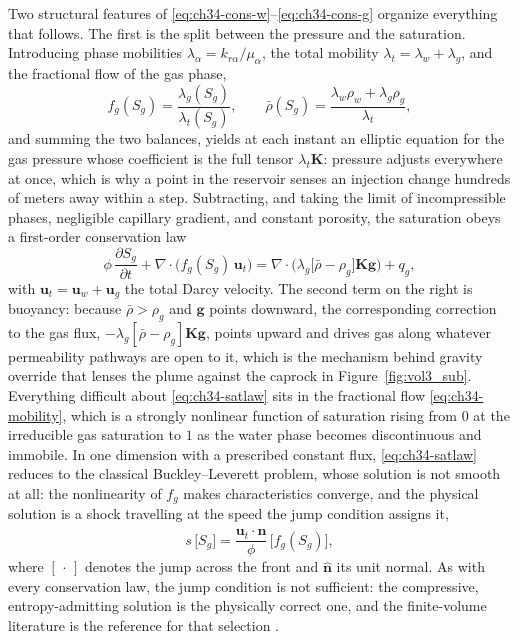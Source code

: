 Two structural features of \eqref{eq:ch34-cons-w}--\eqref{eq:ch34-cons-g} organize
everything that follows. The first is the split between the pressure and the
saturation. Introducing phase mobilities $\lambda_\alpha = k_{r\alpha}/\mu_\alpha$,
the total mobility $\lambda_t = \lambda_w + \lambda_g$, and the fractional flow of
the gas phase,
\begin{equation}
  f_g(S_g) = \frac{\lambda_g(S_g)}{\lambda_t(S_g)}, \qquad
  \bar{\rho}(S_g) = \frac{\lambda_w \rho_w + \lambda_g \rho_g}{\lambda_t},
  \label{eq:ch34-mobility}
\end{equation}
and summing the two balances, yields at each instant an elliptic equation for the
gas pressure whose coefficient is the full tensor $\lambda_t \mathbf{K}$: pressure
adjusts everywhere at once, which is why a point in the reservoir senses an
injection change hundreds of meters away within a step. Subtracting, and taking the
limit of incompressible phases, negligible capillary gradient, and constant
porosity, the saturation obeys a first-order conservation law
\begin{equation}
  \phi\,\frac{\partial S_g}{\partial t} + \nabla \cdot \big( f_g(S_g)\,\mathbf{u}_t \big)
  = \nabla \cdot \big( \lambda_g\big[\bar{\rho} - \rho_g\big]\mathbf{K}\mathbf{g} \big) + q_g,
  \label{eq:ch34-satlaw}
\end{equation}
with $\mathbf{u}_t = \mathbf{u}_w + \mathbf{u}_g$ the total Darcy velocity. The
second term on the right is buoyancy: because $\bar{\rho} > \rho_g$ and
$\mathbf{g}$ points downward, the corresponding correction to the gas flux,
$-\lambda_g[\bar{\rho}-\rho_g]\mathbf{K}\mathbf{g}$, points upward and drives gas
along whatever permeability pathways are open to it, which is the mechanism behind
gravity override that lenses the plume against the caprock in
Figure~\ref{fig:vol3_sub}. Everything
difficult about \eqref{eq:ch34-satlaw} sits in the fractional flow \eqref{eq:ch34-mobility},
which is a strongly nonlinear function of saturation rising from $0$ at the
irreducible gas saturation to $1$ as the water phase becomes discontinuous and
immobile. In one dimension with a prescribed constant flux, \eqref{eq:ch34-satlaw}
reduces to the classical Buckley--Leverett problem, whose solution is not smooth at
all: the nonlinearity of $f_g$ makes characteristics converge, and the physical
solution is a shock travelling at the speed the jump condition assigns it,
\begin{equation}
  s\,\big[S_g\big] = \frac{\mathbf{u}_t \cdot \hat{\mathbf{n}}}{\phi}\,\big[f_g(S_g)\big],
  \label{eq:ch34-rh}
\end{equation}
where $[\,\cdot\,]$ denotes the jump across the front and $\hat{\mathbf{n}}$ its
unit normal. As with every conservation law, the jump condition is not sufficient:
the compressive, entropy-admitting solution is the physically correct one, and the
finite-volume literature is the reference for that selection
\cite{leveque2002finite}.

